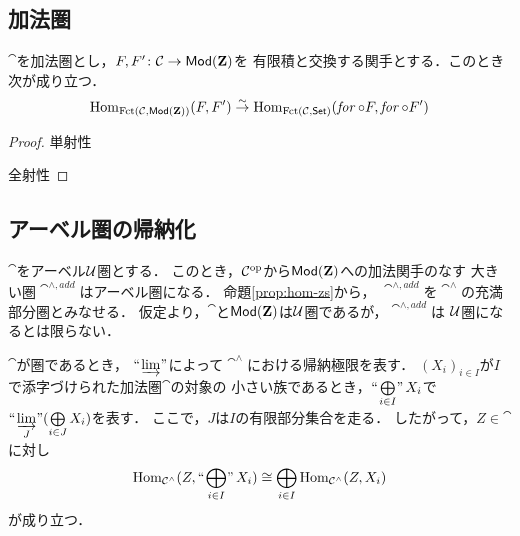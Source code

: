 \subsection{加法圏\cite[\S8.2]{KS06}}\label{sec:add}
\begin{Proposition}\label{prop:hom-zs}
    $\cat$を加法圏とし，$F,F'\colon\mathcal{C}\to\mathop{\textsf{Mod}}\nolimits(\mathbf{Z})$を
    有限積と交換する関手とする．このとき次が成り立つ．
    \begin{equation*}
        \mathop{\mathrm{Hom}}\nolimits_{\mathop{\mathrm{Fct}}\nolimits(\mathcal{C},\mathop{\textsf{Mod}}\nolimits(\mathbf{Z}))}(F,F')
        \overset{\sim}{\rightarrow}
        \mathop{\mathrm{Hom}}\nolimits_{\mathop{\mathrm{Fct}}\nolimits(\mathcal{C},\mathop{\textsf{Set}}\nolimits)}(\mathop{\mathit{for}}\nolimits\circ F,\mathop{\mathit{for}}\nolimits\circ F')
    \end{equation*}
\end{Proposition}
\begin{proof}
    単射性

    全射性
\end{proof}























\subsection{アーベル圏の帰納化\cite[\S8.6]{KS06}}\label{sec:ind-abel}
$\cat$をアーベル$\mathcal{U}$圏とする．
このとき，$\mathcal{C}^{\rm op}$から$\mathop{\textsf{Mod}}\nolimits(\mathbf{Z})$への加法関手のなす
大きい圏$\cat^{\wedge,add}$はアーベル圏になる．
命題\ref{prop:hom-zs}から，
$\cat^{\wedge,add}$を$\cat^\wedge$の充満部分圏とみなせる．
仮定より，$\cat$と$\mathop{\textsf{Mod}}\nolimits(\mathbf{Z})$は$\mathcal{U}$圏であるが，$\cat^{\wedge,add}$は
$\mathcal{U}$圏になるとは限らない．

\begin{Notation}
    $\cat$が圏であるとき，
    $\mathop{\text{``}\hspace{-0.7pt}\varinjlim\hspace{-1.5pt}\text{''}}$によって$\cat^\wedge$における帰納極限を表す．
    $(X_i)_{i\in I}$が$I$で添字づけられた加法圏$\cat$の対象の
    小さい族であるとき，$\ind<\bigoplus_{i\in I}>X_i$で
    $\ind<\varinjlim_J>(\bigoplus\limits_{i\in J}X_i)$を表す．
    ここで，$J$は$I$の有限部分集合を走る．
    したがって，$Z\in\cat$に対し
    \begin{equation*}
        \Hom_{\cat^\wedge}(Z,\ind<\bigoplus_{i\in I}>X_i)
        \cong
        \bigoplus_{i\in I}\Hom_{\cat^\wedge}(Z,X_i)
    \end{equation*}
    が成り立つ．
\end{Notation}

